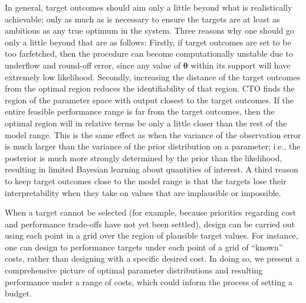 \documentclass[12pt]{article}
\begin{document}
In general, target outcomes should aim only a little beyond what is realistically achievable; only as much as is necessary to ensure the targets are at least as ambitious as any true optimum in the system.
%
Three reasons why one should go only a little beyond that are as follows: 
%
Firstly, if target outcomes are set to be too farfetched, then the procedure can become computationally unstable due  to underflow and round-off error, since any value of $\boldsymbol \theta$ within its support will have extremely low likelihood.
%
Secondly, increasing the distance of the target outcomes from the optimal region reduces the identifiability of that region.
%
CTO finds the region of the parameter space with output closest to the target outcomes.
%
If the entire feasible performance range is far from the target outcomes, then the optimal region will in relative terms be only a little closer than the rest of the model range. 
% 
This is the same effect as when the variance of the observation error is much larger than the variance of the prior distribution on a parameter; i.e., the posterior is much more strongly determined by the prior than the likelihood, resulting in limited Bayesian learning about quantities of interest.
%
%
A third reason to keep target outcomes close to the model range is that the targets lose their interpretability when they take on values that are implausible or impossible. 
%


When a target cannot be selected (for example, because priorities regarding cost and performance trade-offs have not yet been settled), design can be carried out using each point in a grid over the region of plausible target values.
%
For instance, one can design to performance targets under each point of a grid of ``known'' costs, rather than designing with a specific desired cost.
%
In doing so, we present a comprehensive picture of optimal parameter distributions and resulting performance under a range of costs, which could inform the process of setting a budget.
%
\end{document}
